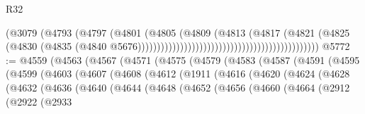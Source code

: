 \begin{lexlean}{R32}
\begin{coremodule}
                                                                        (@3079
                                                                          (@4793
                                                                            (@4797
                                                                              (@4801
                                                                                (@4805
                                                                                  (@4809
                                                                                    (@4813
                                                                                      (@4817
                                                                                        (@4821
                                                                                          (@4825
                                                                                            (@4830
                                                                                              (@4835
                                                                                                (@4840
                                                                                                  @5676)))))))))))))))))))))))))))))))))))))))))))))))
@5772 := @4559
    (@4563
      (@4567
        (@4571
          (@4575
            (@4579
              (@4583
                (@4587
                  (@4591
                    (@4595
                      (@4599
                        (@4603
                          (@4607
                            (@4608
                              (@4612
                                (@1911
                                  (@4616
                                    (@4620
                                      (@4624
                                        (@4628
                                          (@4632
                                            (@4636
                                              (@4640
                                                (@4644
                                                  (@4648
                                                    (@4652
                                                      (@4656
                                                        (@4660
                                                          (@4664
                                                            (@2912
                                                              (@2922
                                                                (@2933

\end{coremodule}
\end{lexlean}

